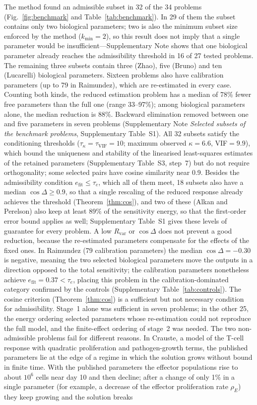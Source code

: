 \documentclass[pdflatex,sn-nature]{sn-jnl}
\theoremstyle{plain}
\begin{document}
The method found an admissible subset in 32 of the 34 problems (Fig.~\ref{fig:benchmark} and Table~\ref{tab:benchmark}). In 29 of them the subset contains only two biological parameters; two is also the minimum subset size enforced by the method ($k_{\min}=2$), so this result does not imply that a single parameter would be insufficient---Supplementary Note \textit{} shows that one biological parameter already reaches the admissibility threshold in 16 of 27 tested problems. The remaining three subsets contain three (Zhao), five (Bruno) and ten (Lucarelli) biological parameters. Sixteen problems also have calibration parameters (up to 79 in Raimundez), which are re-estimated in every case. Counting both kinds, the reduced estimation problem has a median of 78\% fewer free parameters than the full one (range 33--97\%); among biological parameters alone, the median reduction is 88\%. Backward elimination removed between one and five parameters in seven problems (Supplementary Note \textit{Selected subsets of the benchmark problems}, Supplementary Table~S1). All 32 subsets satisfy the conditioning thresholds ($\tau_\kappa=\tau_{\mathrm{VIF}}=10$; maximum observed $\kappa=6.6$, VIF$=9.9$), which bound the uniqueness and stability of the linearised least-squares estimates of the retained parameters (Supplementary Table~S3, step~7) but do not require orthogonality; some selected pairs have cosine similarity near 0.9. Besides the admissibility condition $e_{\mathrm{fit}}\le\tau_e$, which all of them meet, 18 subsets also have a median $\cos\Delta\ge0.9$, so that a single rescaling of the reduced response already achieves the threshold (Theorem~\ref{thm:cos}), and two of these (Alkan and Perelson) also keep at least 89\% of the sensitivity energy, so that the first-order error bound applies as well; Supplementary Table~S1 gives these levels of guarantee for every problem. A low $R_{\mathrm{var}}$ or $\cos\Delta$ does not prevent a good reduction, because the re-estimated parameters compensate for the effects of the fixed ones. In Raimundez (79 calibration parameters) the median $\cos\Delta=-0.30$ is negative, meaning the two selected biological parameters move the outputs in a direction opposed to the total sensitivity; the calibration parameters nonetheless achieve $e_{\mathrm{fit}}=0.37<\tau_e$, placing this problem in the calibration-dominated category confirmed by the controls (Supplementary Table~\ref{tab:controls}). The cosine criterion (Theorem~\ref{thm:cos}) is a sufficient but not necessary condition for admissibility. Stage~1 alone was sufficient in seven problems; in the other 25, the energy ordering selected parameters whose re-estimation could not reproduce the full model, and the finite-effect ordering of stage~2 was needed. The two non-admissible problems fail for different reasons. In Crauste, a model of the T-cell response with quadratic proliferation and pathogen-growth terms, the published parameters lie at the edge of a regime in which the solution grows without bound in finite time. With the published parameters the effector populations rise to about $10^6$ cells near day 10 and then decline; after a change of only 1\% in a single parameter (for example, a decrease of the effector proliferation rate $\rho_E$) they keep growing and the solution breaks 
\end{document}
